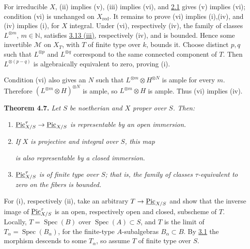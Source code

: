 For irreducible \(X\), (ii) implies (v), (iii) implies (vi), and \hyperlink{sga6.e13.para.2-1}{2.1}
gives (v) implies (vi); condition (vi) is unchanged on
\(X_{\mathrm{red}}\). It remains to prove (vi) implies (i),(iv), and
(iv) implies (i), for \(X\) integral. Under (vi), respectively (iv), the
family of classes \(L^{\otimes m}\), \(m\in\mathbb N\), satisfies \hyperlink{sga6.e13.thm.3-13}{3.13
(iii)}, respectively (iv), and is bounded. Hence some invertible
\(\mathcal M\) on \(X_T\), with \(T\) of finite type over \(k\), bounds
it. Choose distinct \(p,q\) such that \(L^{\otimes p}\) and
\(L^{\otimes q}\) correspond to the same connected component of \(T\).
Then \(L^{\otimes(p-q)}\) is algebraically equivalent to zero, proving
(i).

Condition (vi) also gives an \(N\) such that
\(L^{\otimes m}\otimes H^{\otimes N}\) is ample for every \(m\).
Therefore \((L^{\otimes m}\otimes H)^{\otimes N}\) is ample, so
\(L^{\otimes m}\otimes H\) is ample. Thus (vi) implies (iv).

\textbf{Theorem 4.7.} \emph{Let \(S\) be noetherian and \(X\) proper over
\(S\). Then:}
\begin{enumerate}[label=(\roman*)]
\item \emph{\(\underline{\operatorname{Pic}}^{\tau}_{X/S}\to
\underline{\operatorname{Pic}}_{X/S}\) is representable by an open immersion.}
\item \emph{If \(X\) is projective and integral over \(S\), this map}

\emph{is also representable by a closed immersion.}
\item \emph{\(\underline{\operatorname{Pic}}^{\tau}_{X/S}\) is of finite type over
\(S\); that is, the family of classes \(\tau\)-equivalent to zero on the
fibers is bounded.}
\end{enumerate}

For (i), respectively (ii), take an arbitrary
\(T\to\underline{\operatorname{Pic}}_{X/S}\) and show that the inverse image of
\(\underline{\operatorname{Pic}}^{\tau}_{X/S}\) is an open, respectively open and
closed, subscheme of \(T\). Locally, \(T=\operatorname{Spec}(B)\) over
\(\operatorname{Spec}(A)\subset S\), and \(T\) is the limit of
\(T_\alpha=\operatorname{Spec}(B_\alpha)\), for the finite-type
\(A\)-subalgebras \(B_\alpha\subset B\). By \hyperlink{sga6.e13.lem.3-1}{3.1} the morphism descends to
some \(T_\alpha\), so assume \(T\) of finite type over \(S\).

